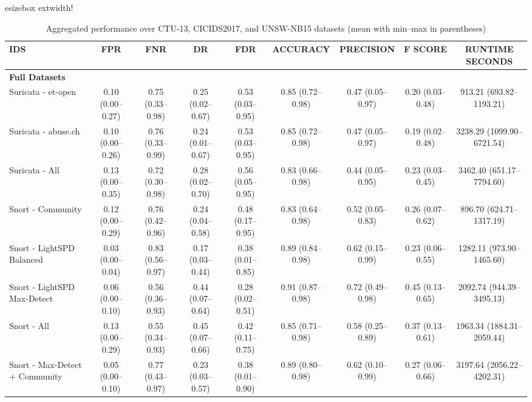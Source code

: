 \begin{table}[t]
    \centering
    \caption{Aggregated performance over CTU-13, CICIDS2017, and UNSW-NB15 datasets (mean with min--max in parentheses)}
    \label{tab:ids_performance_aggregated}
    \renewcommand{\arraystretch}{1.5}
   
esizebox{	extwidth}{!}{%
    \begin{tabular}{lcccccccc}
        \toprule
        \textbf{IDS} & \textbf{FPR} & \textbf{FNR} & \textbf{DR} & \textbf{FDR} & \textbf{ACCURACY} & \textbf{PRECISION} & \textbf{F SCORE} & \textbf{RUNTIME SECONDS} \\
        \midrule
        \multicolumn{9}{l}{\textbf{Full Datasets}} \\
        Suricata - et-open & 0.10 (0.00–0.27) & 0.75 (0.33–0.98) & 0.25 (0.02–0.67) & 0.53 (0.03–0.95) & 0.85 (0.72–0.98) & 0.47 (0.05–0.97) & 0.20 (0.03–0.48) & 913.21 (693.82–1193.21) \\
        Suricata - abuse.ch & 0.10 (0.00–0.26) & 0.76 (0.33–0.99) & 0.24 (0.01–0.67) & 0.53 (0.03–0.95) & 0.85 (0.72–0.98) & 0.47 (0.05–0.97) & 0.19 (0.02–0.48) & 3238.29 (1099.90–6721.54) \\
        Suricata - All & 0.13 (0.00–0.35) & 0.72 (0.30–0.98) & 0.28 (0.02–0.70) & 0.56 (0.05–0.95) & 0.83 (0.66–0.98) & 0.44 (0.05–0.95) & 0.23 (0.03–0.45) & 3462.40 (651.17–7794.60) \\
        Snort - Community & 0.12 (0.00–0.29) & 0.76 (0.42–0.96) & 0.24 (0.04–0.58) & 0.48 (0.17–0.95) & 0.83 (0.64–0.98) & 0.52 (0.05–0.83) & 0.26 (0.07–0.62) & 896.70 (624.71–1317.19) \\
        Snort - LightSPD Balanced & 0.03 (0.00–0.04) & 0.83 (0.56–0.97) & 0.17 (0.03–0.44) & 0.38 (0.01–0.85) & 0.89 (0.84–0.98) & 0.62 (0.15–0.99) & 0.23 (0.06–0.55) & 1282.11 (973.90–1465.60) \\
        Snort - LightSPD Max-Detect & 0.06 (0.00–0.10) & 0.56 (0.36–0.93) & 0.44 (0.07–0.64) & 0.28 (0.02–0.51) & 0.91 (0.87–0.98) & 0.72 (0.49–0.98) & 0.45 (0.13–0.65) & 2092.74 (944.39–3495.13) \\
        Snort - All & 0.13 (0.00–0.29) & 0.55 (0.34–0.93) & 0.45 (0.07–0.66) & 0.42 (0.11–0.75) & 0.85 (0.71–0.98) & 0.58 (0.25–0.89) & 0.37 (0.13–0.61) & 1963.34 (1884.31–2059.44) \\
        Snort - Max-Detect + Community & 0.05 (0.00–0.10) & 0.77 (0.43–0.97) & 0.23 (0.03–0.57) & 0.38 (0.01–0.90) & 0.89 (0.80–0.98) & 0.62 (0.10–0.99) & 0.27 (0.06–0.66) & 3197.64 (2056.22–4202.31) \\

\end{tabular}}
\end{table}
